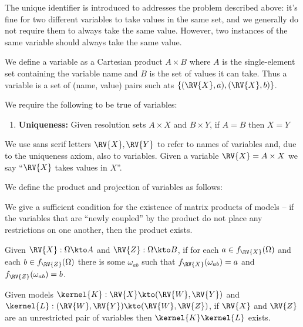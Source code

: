 The unique identifier is introduced to addresses the problem described above: it's fine for two different variables to take values in the same set, and we generally do not require them to always take the same value. However, two instances of the same variable should always take the same value.

We define a variable as a Cartesian product $A\times B$ where $A$ is the single-element set containing the variable name and $B$ is the set of values it can take. Thus a variable is a set of (name, value) pairs such ats $\{(\RV{X},a),(\RV{X},b)\}$.

We require the following to be true of variables:

\begin{enumerate}
    \item \textbf{Uniqueness:} Given resolution sets $A\times X$ and $B\times Y$, if $A=B$ then $X=Y$
\end{enumerate}

We use sans serif letters $\RV{X},\RV{Y}$ to refer to names of variables and, due to the uniqueness axiom, also to variables. Given a variable $\RV{X}=A\times X$ we say ``$\RV{X}$ takes values in $X$''.


We define the product and projection of variables as follows:



We give a sufficient condition for the existence of matrix products of models -- if the variables that are ``newly coupled'' by the product do not place any restrictions on one another, then the product exists.

\begin{definition}
Given $\RV{X}:\Omega\kto A$ and $\RV{Z}:\Omega\kto B$, if for each $a\in f_{\RV{X}}(\Omega)$ and each $b\in f_{\RV{Z}}(\Omega)$ there is some $\omega_{ab}$ such that $f_{\RV{X}}(\omega_{ab})=a$ and $f_{\RV{Z}}(\omega_{ab})=b$.
\end{definition}

\begin{lemma}
Given models $\kernel{K}:\RV{X}\kto (\RV{W},\RV{Y})$ and $\kernel{L}:(\RV{W},\RV{Y})\kto (\RV{W},\RV{Z})$, if $\RV{X}$ and $\RV{Z}$ are an unrestricted pair of variables then $\kernel{K}\kernel{L}$ exists.
\end{lemma}

